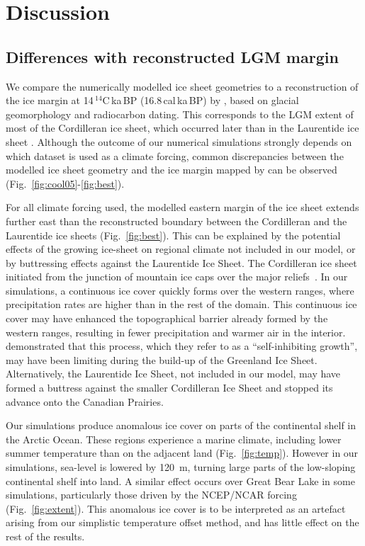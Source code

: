 \section{Discussion}
\label{sec:discussion}

\subsection{Differences with reconstructed LGM margin}

We compare the numerically modelled ice sheet geometries to a reconstruction of the ice margin at 14\,$^{14}$C\,ka\,BP (16.8\,cal\,ka\,BP) by \citet{dyke-2004}, based on glacial geomorphology and radiocarbon dating. This corresponds to the LGM extent of most of the Cordilleran ice sheet, which occurred later than in the Laurentide ice sheet \citep{dyke-2004}.
Although the outcome of our numerical simulations strongly depends on which dataset is used as a climate forcing, common discrepancies between the modelled ice sheet geometry and the ice margin mapped by \citet{dyke-2004} can be observed (Fig.~\ref{fig:cool05}-\ref{fig:best}).

For all climate forcing used, the modelled eastern margin of the ice sheet extends further east than the reconstructed boundary between the Cordilleran and the Laurentide ice sheets (Fig.~\ref{fig:best}). This can be explained by the potential effects of the growing ice-sheet on regional climate not included in our model, or by buttressing effects against the Laurentide Ice Sheet. The Cordilleran ice sheet initiated from the junction of mountain ice caps over the major reliefs~\citep{clague-1989}. In our simulations, a continuous ice cover quickly forms over the western ranges, where precipitation rates are higher than in the rest of the domain. This continuous ice cover may have enhanced the topographical barrier already formed by the western ranges, resulting in fewer precipitation and warmer air in the interior. \citet{langen-etal-2012} demonstrated that this process, which they refer to as a ``self-inhibiting growth'', may have been limiting during the build-up of the Greenland Ice Sheet. Alternatively, the Laurentide Ice Sheet, not included in our model, may have formed a buttress against the smaller Cordilleran Ice Sheet and stopped its advance onto the Canadian Prairies.

Our simulations produce anomalous ice cover on parts of the continental shelf in the Arctic Ocean. These regions experience a marine climate, including lower summer temperature than on the adjacent land (Fig.~\ref{fig:temp}). However in our simulations, sea-level is lowered by 120~m, turning large parts of the low-sloping continental shelf into land. A similar effect occurs over Great Bear Lake in some simulations, particularly those driven by the NCEP/NCAR forcing (Fig.~\ref{fig:extent}). This anomalous ice cover is to be interpreted as an artefact arising from our simplistic temperature offset method, and has little effect on the rest of the results.

